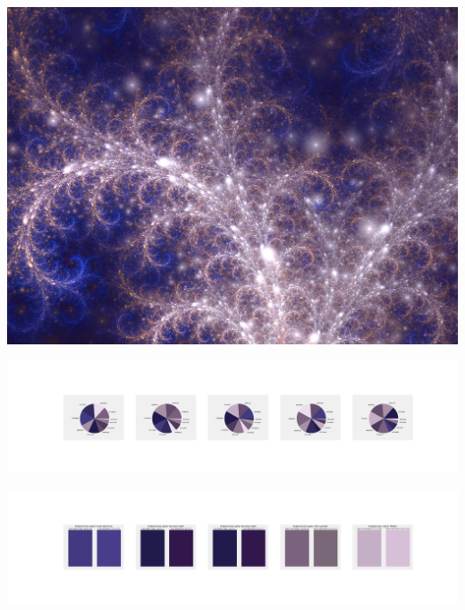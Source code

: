 \documentclass[11pt]{article}
\begin{document}
\begin{landscape}
    \begin{center}
    \includegraphics[width=\textwidth]{./nbimg/file (218).jpg}
    \end{center}

    \begin{center}
    \includegraphics[width=250mm]{./nbimg/pie-132.jpg}
    \end{center}

    \begin{center}
    \includegraphics[width=250mm]{./nbimg/peak-132.jpg}
    \end{center}
    


\end{landscape}
\end{document}
